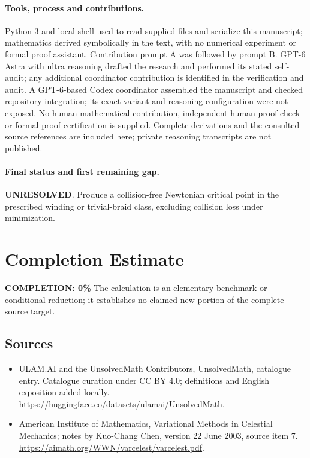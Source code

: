 \documentclass[11pt]{article}
\begin{document}
\paragraph{Tools, process and contributions.}
Python 3 and local shell used to read supplied files and serialize this manuscript; mathematics derived symbolically in the text, with no numerical experiment or formal proof assistant. Contribution prompt A was followed by prompt B. GPT-6 Astra with ultra reasoning drafted the research and performed its stated self-audit; any additional coordinator contribution is identified in the verification and audit. A GPT-6-based Codex coordinator assembled the manuscript and checked repository integration; its exact variant and reasoning configuration were not exposed. No human mathematical contribution, independent human proof check or formal proof certification is supplied. Complete derivations and the consulted source references are included here; private reasoning transcripts are not published.

\paragraph{Final status and first remaining gap.}
\textbf{UNRESOLVED}. Produce a collision-free Newtonian critical point in the prescribed winding or trivial-braid class, excluding collision loss under minimization.

\section{Completion Estimate}
\noindent\textbf{COMPLETION: 0\%}
The calculation is an elementary benchmark or conditional reduction; it establishes no claimed new portion of the complete source target.

\subsection{Sources}
\begin{itemize}
\item[\hypertarget{source:statement:1}{S1}] ULAM.AI and the UnsolvedMath Contributors, UnsolvedMath, catalogue entry. Catalogue curation under CC BY 4.0; definitions and English exposition added locally.
\url{https://huggingface.co/datasets/ulamai/UnsolvedMath}.
\item[\hypertarget{source:statement:2}{S2}] American Institute of Mathematics, Variational Methods in Celestial Mechanics; notes by Kuo-Chang Chen, version 22 June 2003, source item 7.
\url{https://aimath.org/WWN/varcelest/varcelest.pdf}.
\end{itemize}
\label{end:statement}
\end{document}
